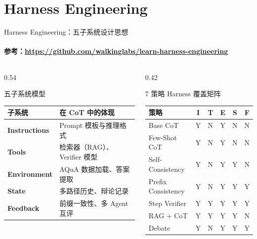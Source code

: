 \documentclass[10pt,aspectratio=169]{beamer}
\begin{document}
\section{Harness Engineering}

\begin{frame}{Harness Engineering：五子系统设计思想}
  \framesubtitle{参考：\url{https://github.com/walkinglabs/learn-harness-engineering}}
  \small
  \begin{columns}[T,onlytextwidth]
    \begin{column}{0.54\textwidth}
      \begin{block}{五子系统模型}
        \begin{tabular}{ll}
          \toprule
          子系统 & 在 CoT 中的体现 \\
          \midrule
          \textbf{Instructions} & Prompt 模板与推理格式 \\
          \textbf{Tools} & 检索器（RAG）、Verifier 模型 \\
          \textbf{Environment} & AQuA 数据加载、答案提取 \\
          \textbf{State} & 多路径历史、辩论记录 \\
          \textbf{Feedback} & 前缀一致性、多 Agent 互评 \\
          \bottomrule
        \end{tabular}
      \end{block}
    \end{column}
    \begin{column}{0.42\textwidth}
      \begin{block}{7 策略 Harness 覆盖矩阵}
        \scriptsize
        \begin{tabular}{lccccc}
          \toprule
          策略 & I & T & E & S & F \\
          \midrule
          Base CoT & Y & N & Y & N & N \\
          Few-Shot CoT & Y & N & Y & N & N \\
          Self-Consistency & Y & N & Y & Y & N \\
          Prefix Consistency & Y & N & Y & Y & Y \\
          Step Verifier & Y & Y & Y & Y & Y \\
          RAG + CoT & Y & Y & Y & Y & N \\
          Debate & Y & N & Y & Y & Y \\
          \bottomrule
        \end{tabular}
      \end{block}
    \end{column}
  \end{columns}
\end{frame}
\end{document}

